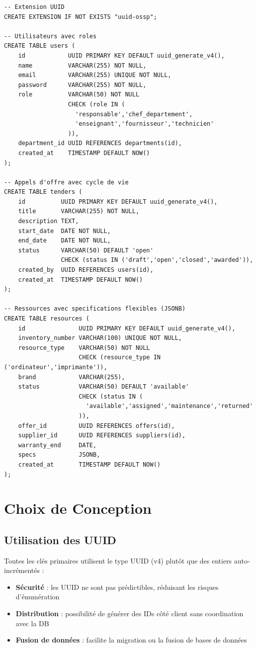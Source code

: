 \documentclass[12pt,a4paper]{report}
\begin{document}
\begin{lstlisting}[style=sql, caption={Schéma — Tables principales (extrait)}]
-- Extension UUID
CREATE EXTENSION IF NOT EXISTS "uuid-ossp";

-- Utilisateurs avec roles
CREATE TABLE users (
    id            UUID PRIMARY KEY DEFAULT uuid_generate_v4(),
    name          VARCHAR(255) NOT NULL,
    email         VARCHAR(255) UNIQUE NOT NULL,
    password      VARCHAR(255) NOT NULL,
    role          VARCHAR(50) NOT NULL
                  CHECK (role IN (
                    'responsable','chef_departement',
                    'enseignant','fournisseur','technicien'
                  )),
    department_id UUID REFERENCES departments(id),
    created_at    TIMESTAMP DEFAULT NOW()
);

-- Appels d'offre avec cycle de vie
CREATE TABLE tenders (
    id          UUID PRIMARY KEY DEFAULT uuid_generate_v4(),
    title       VARCHAR(255) NOT NULL,
    description TEXT,
    start_date  DATE NOT NULL,
    end_date    DATE NOT NULL,
    status      VARCHAR(50) DEFAULT 'open'
                CHECK (status IN ('draft','open','closed','awarded')),
    created_by  UUID REFERENCES users(id),
    created_at  TIMESTAMP DEFAULT NOW()
);

-- Ressources avec specifications flexibles (JSONB)
CREATE TABLE resources (
    id               UUID PRIMARY KEY DEFAULT uuid_generate_v4(),
    inventory_number VARCHAR(100) UNIQUE NOT NULL,
    resource_type    VARCHAR(50) NOT NULL
                     CHECK (resource_type IN ('ordinateur','imprimante')),
    brand            VARCHAR(255),
    status           VARCHAR(50) DEFAULT 'available'
                     CHECK (status IN (
                       'available','assigned','maintenance','returned'
                     )),
    offer_id         UUID REFERENCES offers(id),
    supplier_id      UUID REFERENCES suppliers(id),
    warranty_end     DATE,
    specs            JSONB,
    created_at       TIMESTAMP DEFAULT NOW()
);
\end{lstlisting}

\section{Choix de Conception}

\subsection{Utilisation des UUID}

Toutes les clés primaires utilisent le type UUID (v4) plutôt que des entiers auto-incrémentés :
\begin{itemize}[leftmargin=1.5cm]
    \item \textbf{Sécurité} : les UUID ne sont pas prédictibles, réduisant les risques d'énumération
    \item \textbf{Distribution} : possibilité de générer des IDs côté client sans coordination avec la DB
    \item \textbf{Fusion de données} : facilite la migration ou la fusion de bases de données
\end{itemize}
\end{document}
